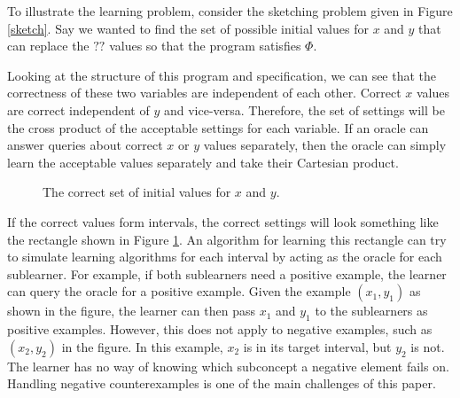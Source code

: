To illustrate the learning problem, consider the sketching problem given in Figure \ref{sketch}.
Say we wanted to find the set of possible initial values for $x$ and $y$ that can replace the $??$ values so that the program satisfies $\Phi$.

Looking at the structure of this program and specification, we can see that the correctness of these two variables are independent of each other. 
Correct $x$ values are correct independent of $y$ and vice-versa.
Therefore, the set of settings will be the cross product of the acceptable settings for each variable.  
If an oracle can answer queries about correct $x$ or $y$ values separately, then the oracle can simply learn the acceptable values separately and take their Cartesian product. 

\begin{figure}
\caption{The correct set of initial values for $x$ and $y$.}
\label{sketchsolutions}
\end{figure}


If the correct values form intervals, the correct settings will look something like the rectangle shown in Figure \ref{sketchsolutions}.
An algorithm for learning this rectangle can try to simulate learning algorithms for each interval by acting as the oracle for each sublearner. 
For example, if both sublearners need a positive example, the learner can query the oracle for a positive example. 
Given the example $(x_1,y_1)$ as shown in the figure, the learner can then pass $x_1$ and $y_1$ to the sublearners as positive examples. 
However, this does not apply to negative examples, such as $(x_2, y_2)$ in the figure. 
In this example, $x_2$ is in its target interval, but $y_2$ is not. 
The learner has no way of knowing which subconcept a negative element fails on.
Handling negative counterexamples is one of the main challenges of this paper.




